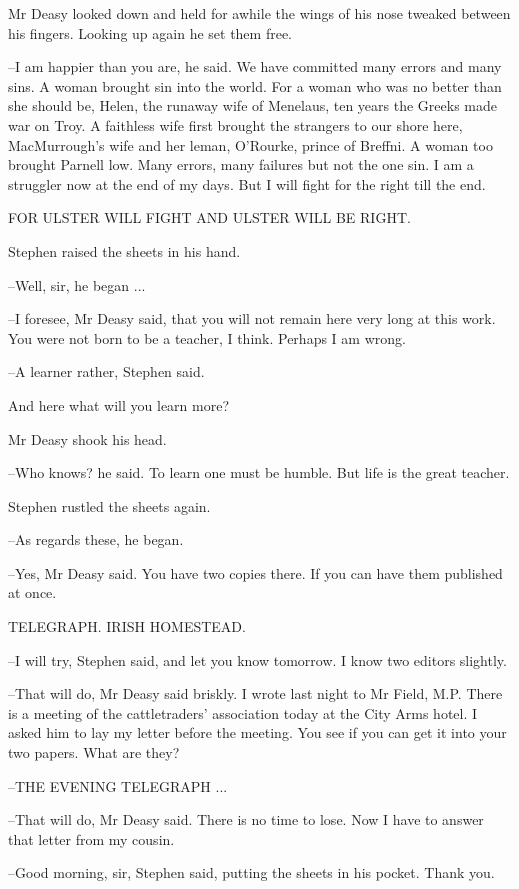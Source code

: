 Mr Deasy looked down and held for awhile the wings of his nose
tweaked between his fingers. Looking up again he set them free.

--I am happier than you are, he said. We have committed many errors and
many sins. A woman brought sin into the world. For a woman who was no
better than she should be, Helen, the runaway wife of Menelaus, ten years
the Greeks made war on Troy. A faithless wife first brought the strangers
to our shore here, MacMurrough's wife and her leman, O'Rourke, prince of
Breffni. A woman too brought Parnell low. Many errors, many failures but
not the one sin. I am a struggler now at the end of my days. But I will
fight for the right till the end.


    FOR ULSTER WILL FIGHT
    AND ULSTER WILL BE RIGHT.


Stephen raised the sheets in his hand.

--Well, sir, he began ...

--I foresee, Mr Deasy said, that you will not remain here very long at
this work. You were not born to be a teacher, I think. Perhaps I am
wrong.

--A learner rather, Stephen said.

And here what will you learn more?

Mr Deasy shook his head.

--Who knows? he said. To learn one must be humble. But life is the great
teacher.

Stephen rustled the sheets again.

--As regards these, he began.

--Yes, Mr Deasy said. You have two copies there. If you can have them
published at once.

TELEGRAPH. IRISH HOMESTEAD.

--I will try, Stephen said, and let you know tomorrow. I know two editors
slightly.

--That will do, Mr Deasy said briskly. I wrote last night to Mr Field,
M.P. There is a meeting of the cattletraders' association today at the
City Arms hotel. I asked him to lay my letter before the meeting. You see
if you can get it into your two papers. What are they?

--THE EVENING TELEGRAPH ...

--That will do, Mr Deasy said. There is no time to lose. Now I have to
answer that letter from my cousin.

--Good morning, sir, Stephen said, putting the sheets in his pocket.
Thank you.

